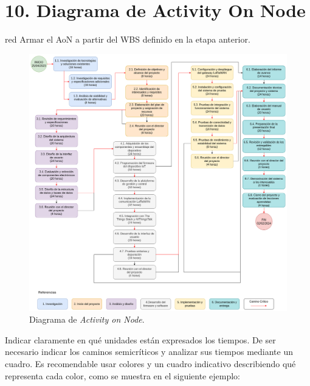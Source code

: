 \documentclass[
11pt, %
]{charter}
\begin{document}
\vspace*{\fill}
\pagebreak

\section{10. Diagrama de Activity On Node}
\label{sec:AoN}

\begin{consigna}{red}
Armar el AoN a partir del WBS definido en la etapa anterior. 



\end{consigna}

\begin{figure}[htpb]
\centering 
\includegraphics[width=.8\textwidth]{./Figuras/AoN.png}
\caption{Diagrama de \textit{Activity on Node}.}
\label{fig:AoN}
\end{figure}

Indicar claramente en qué unidades están expresados los tiempos.
De ser necesario indicar los caminos semicríticos y analizar sus tiempos mediante un cuadro.
Es recomendable usar colores y un cuadro indicativo describiendo qué representa cada color, como se muestra en el siguiente ejemplo:
\end{document}

